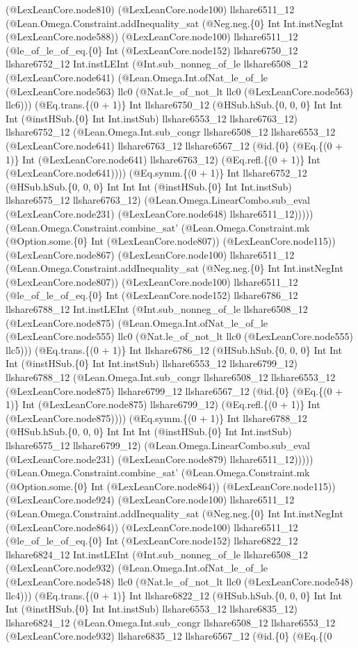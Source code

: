 \documentclass[11pt]{article}
\begin{document}
(@LexLeanCore.node810) (@LexLeanCore.node100) llshare6511\_12 (@Lean.Omega.Constraint.addInequality\_sat (@Neg.neg.\{0\} Int Int.instNegInt (@LexLeanCore.node588)) (@LexLeanCore.node100) llshare6511\_12 (@le\_of\_le\_of\_eq.\{0\} Int (@LexLeanCore.node152) llshare6750\_12 llshare6752\_12 Int.instLEInt (@Int.sub\_nonneg\_of\_le llshare6508\_12 (@LexLeanCore.node641) (@Lean.Omega.Int.ofNat\_le\_of\_le (@LexLeanCore.node563) llc0 (@Nat.le\_of\_not\_lt llc0 (@LexLeanCore.node563) llc6))) (@Eq.trans.\{(0 + 1)\} Int llshare6750\_12 (@HSub.hSub.\{0, 0, 0\} Int Int Int (@instHSub.\{0\} Int Int.instSub) llshare6553\_12 llshare6763\_12) llshare6752\_12 (@Lean.Omega.Int.sub\_congr llshare6508\_12 llshare6553\_12 (@LexLeanCore.node641) llshare6763\_12 llshare6567\_12 (@id.\{0\} (@Eq.\{(0 + 1)\} Int (@LexLeanCore.node641) llshare6763\_12) (@Eq.refl.\{(0 + 1)\} Int (@LexLeanCore.node641)))) (@Eq.symm.\{(0 + 1)\} Int llshare6752\_12 (@HSub.hSub.\{0, 0, 0\} Int Int Int (@instHSub.\{0\} Int Int.instSub) llshare6575\_12 llshare6763\_12) (@Lean.Omega.LinearCombo.sub\_eval (@LexLeanCore.node231) (@LexLeanCore.node648) llshare6511\_12))))) (@Lean.Omega.Constraint.combine\_sat' (@Lean.Omega.Constraint.mk (@Option.some.\{0\} Int (@LexLeanCore.node807)) (@LexLeanCore.node115)) (@LexLeanCore.node867) (@LexLeanCore.node100) llshare6511\_12 (@Lean.Omega.Constraint.addInequality\_sat (@Neg.neg.\{0\} Int Int.instNegInt (@LexLeanCore.node807)) (@LexLeanCore.node100) llshare6511\_12 (@le\_of\_le\_of\_eq.\{0\} Int (@LexLeanCore.node152) llshare6786\_12 llshare6788\_12 Int.instLEInt (@Int.sub\_nonneg\_of\_le llshare6508\_12 (@LexLeanCore.node875) (@Lean.Omega.Int.ofNat\_le\_of\_le (@LexLeanCore.node555) llc0 (@Nat.le\_of\_not\_lt llc0 (@LexLeanCore.node555) llc5))) (@Eq.trans.\{(0 + 1)\} Int llshare6786\_12 (@HSub.hSub.\{0, 0, 0\} Int Int Int (@instHSub.\{0\} Int Int.instSub) llshare6553\_12 llshare6799\_12) llshare6788\_12 (@Lean.Omega.Int.sub\_congr llshare6508\_12 llshare6553\_12 (@LexLeanCore.node875) llshare6799\_12 llshare6567\_12 (@id.\{0\} (@Eq.\{(0 + 1)\} Int (@LexLeanCore.node875) llshare6799\_12) (@Eq.refl.\{(0 + 1)\} Int (@LexLeanCore.node875)))) (@Eq.symm.\{(0 + 1)\} Int llshare6788\_12 (@HSub.hSub.\{0, 0, 0\} Int Int Int (@instHSub.\{0\} Int Int.instSub) llshare6575\_12 llshare6799\_12) (@Lean.Omega.LinearCombo.sub\_eval (@LexLeanCore.node231) (@LexLeanCore.node879) llshare6511\_12))))) (@Lean.Omega.Constraint.combine\_sat' (@Lean.Omega.Constraint.mk (@Option.some.\{0\} Int (@LexLeanCore.node864)) (@LexLeanCore.node115)) (@LexLeanCore.node924) (@LexLeanCore.node100) llshare6511\_12 (@Lean.Omega.Constraint.addInequality\_sat (@Neg.neg.\{0\} Int Int.instNegInt (@LexLeanCore.node864)) (@LexLeanCore.node100) llshare6511\_12 (@le\_of\_le\_of\_eq.\{0\} Int (@LexLeanCore.node152) llshare6822\_12 llshare6824\_12 Int.instLEInt (@Int.sub\_nonneg\_of\_le llshare6508\_12 (@LexLeanCore.node932) (@Lean.Omega.Int.ofNat\_le\_of\_le (@LexLeanCore.node548) llc0 (@Nat.le\_of\_not\_lt llc0 (@LexLeanCore.node548) llc4))) (@Eq.trans.\{(0 + 1)\} Int llshare6822\_12 (@HSub.hSub.\{0, 0, 0\} Int Int Int (@instHSub.\{0\} Int Int.instSub) llshare6553\_12 llshare6835\_12) llshare6824\_12 (@Lean.Omega.Int.sub\_congr llshare6508\_12 llshare6553\_12 (@LexLeanCore.node932) llshare6835\_12 llshare6567\_12 (@id.\{0\} (@Eq.\{(0 
\end{document}

